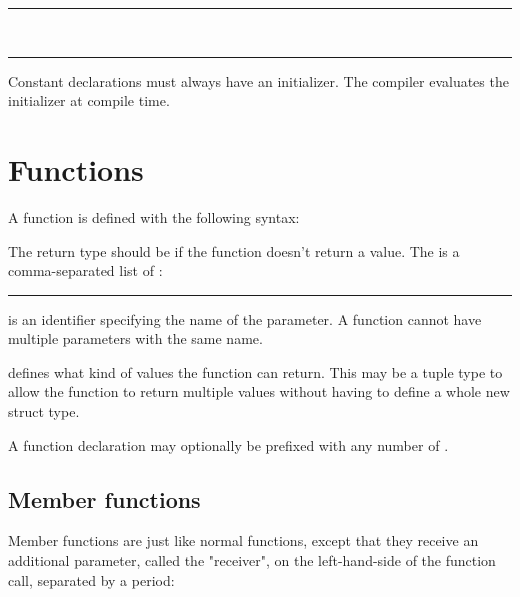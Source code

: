 \begin{grammar}
\rule{implicitly-typed-constant-definition}   \code{=}  \code{;}\\
\rule{explicitly-typed-constant-definition}    \code{=}  \code{;}
\end{grammar}

Constant declarations must always have an initializer. The compiler evaluates the initializer at compile time.

\section{Functions}

A function is defined with the following syntax:

\begin{grammar}
  \code{(}  \code{)} \code{\{}  \code{\}}
\end{grammar}

The return type should be  if the function doesn't return a value. The
 is a comma-separated list of
:

\begin{grammar}
\rule{parameter}  
\end{grammar}

 is an identifier specifying the name of the
parameter. A function cannot have multiple parameters with the same name.

 defines what kind of values the function can return.
This may be a tuple type to allow the function to return multiple values without
having to define a whole new struct type.

A function declaration may optionally be prefixed with any number of
\hyperref[sec:function-specifiers]{}.

\subsection{Member functions}

Member functions are just like normal functions, except that they receive an
additional parameter, called the "receiver", on the left-hand-side of the
function call, separated by a period:

